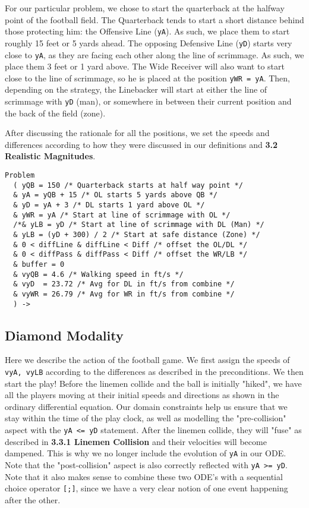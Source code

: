 \quad For our particular problem, we chose to start the quarterback at the halfway point of the football field. The Quarterback tends to start a short distance behind those protecting him: the Offensive Line (\texttt{yA}). As such, we place them to start roughly 15 feet or 5 yards ahead. The opposing Defensive Line (\texttt{yD}) starts very close to \texttt{yA}, as they are facing each other along the line of scrimmage. As such, we place them 3 feet or 1 yard above. The Wide Receiver will also want to start close to the line of scrimmage, so he is placed at the position \texttt{yWR = yA}. Then, depending on the strategy, the Linebacker will start at either the line of scrimmage with \texttt{yD} (man), or somewhere in between their current position and the back of the field (zone). 

After discussing the rationale for all the positions, we set the speeds and differences according to how they were discussed in our definitions and \textbf{3.2 Realistic Magnitudes}.

\begin{lstlisting}
Problem
  ( yQB = 150 /* Quarterback starts at half way point */
  & yA = yQB + 15 /* OL starts 5 yards above QB */
  & yD = yA + 3 /* DL starts 1 yard above OL */
  & yWR = yA /* Start at line of scrimmage with OL */
  /*& yLB = yD /* Start at line of scrimmage with DL (Man) */
  & yLB = (yD + 300) / 2 /* Start at safe distance (Zone) */
  & 0 < diffLine & diffLine < Diff /* offset the OL/DL */
  & 0 < diffPass & diffPass < Diff /* offset the WR/LB */
  & buffer = 0
  & vyQB = 4.6 /* Walking speed in ft/s */
  & vyD  = 23.72 /* Avg for DL in ft/s from combine */
  & vyWR = 26.79 /* Avg for WR in ft/s from combine */
  ) ->
\end{lstlisting}

\newpage 
\subsection{Diamond Modality}

\quad Here we describe the action of the football game. We first assign the speeds of \texttt{vyA, vyLB} according to the differences as described in the preconditions. We then start the play! Before the linemen collide and the ball is initially "hiked", we have all the players moving at their initial speeds and directions as shown in the ordinary differential equation. Our domain constraints help us ensure that we stay within the time of the play clock, as well as modelling the "pre-collision" aspect with the \texttt{yA <= yD} statement. After the linemen collide, they will "fuse" as described in \textbf{3.3.1 Linemen Collision} and their velocities will become dampened. This is why we no longer include the evolution of \texttt{yA} in our ODE. Note that the "post-collision" aspect is also correctly reflected with \texttt{yA >= yD}. Note that it also makes sense to combine these two ODE's with a sequential choice operator \texttt{[;]}, since we have a very clear notion of one event happening after the other.

